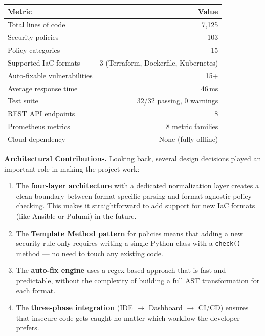 \begin{table}[H]
\centering
\begin{tabularx}{0.85\textwidth}{|X|r|}
\hline
\textbf{Metric} & \textbf{Value} \\
\hline
Total lines of code       & 7{,}125 \\
\hline
Security policies         & 103 \\
\hline
Policy categories         & 15 \\
\hline
Supported IaC formats     & 3 (Terraform, Dockerfile, Kubernetes) \\
\hline
Auto-fixable vulnerabilities & 15+ \\
\hline
Average response time     & 46\,ms \\
\hline
Test suite                & 32/32 passing, 0 warnings \\
\hline
REST API endpoints        & 8 \\
\hline
Prometheus metrics        & 8 metric families \\
\hline
Cloud dependency          & None (fully offline) \\
\hline
\end{tabularx}
\end{table}


\vspace{0.3cm}
\noindent\textbf{Architectural Contributions.}\quad
Looking back, several design decisions played an important role in making the project work:

\begin{enumerate}[leftmargin=1.5cm]
  \item The \textbf{four-layer architecture} with a dedicated normalization layer creates a clean boundary between format-specific parsing and format-agnostic policy checking. This makes it straightforward to add support for new IaC formats (like Ansible or Pulumi) in the future.
  
  \item The \textbf{Template Method pattern} for policies means that adding a new security rule only requires writing a single Python class with a \texttt{check()} method --- no need to touch any existing code.
  
  \item The \textbf{auto-fix engine} uses a regex-based approach that is fast and predictable, without the complexity of building a full AST transformation for each format.
  
  \item The \textbf{three-phase integration} (IDE $\rightarrow$ Dashboard $\rightarrow$ CI/CD) ensures that insecure code gets caught no matter which workflow the developer prefers.
\end{enumerate}

